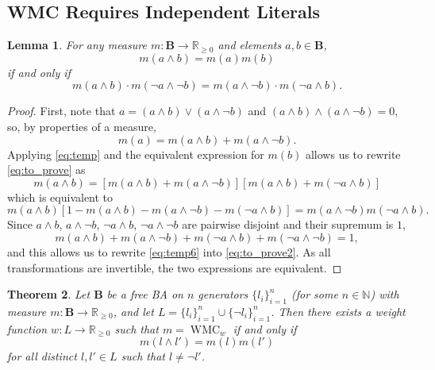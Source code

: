 \documentclass{article}
\newtheorem{theorem}{Theorem}
\newtheorem{lemma}[theorem]{Lemma}
\theoremstyle{definition}
\theoremstyle{remark}
\DeclareMathOperator{\WMC}{WMC}
\begin{document}

\subsection{WMC Requires Independent Literals}

\begin{lemma} \label{lemma:before_theorem}
  For any measure $m\colon \mathbf{B} \to \mathbb{R}_{\ge 0}$ and elements $a, b
  \in \mathbf{B}$,
  \begin{equation} \label{eq:to_prove}
    m(a \land b) = m(a)m(b)
  \end{equation}
  if and only if
  \begin{equation} \label{eq:to_prove2}
    m(a \land b) \cdot m(\neg a \land \neg b) = m(a \land \neg b)
    \cdot m(\neg a \land b).
  \end{equation}
\end{lemma}
\begin{proof}
  First, note that $a = (a \land b) \lor (a \land \neg b)$ and $(a \land b)
  \land (a \land \neg b) = 0$, so, by properties of a measure,
  \begin{equation} \label{eq:temp}
    m(a) = m(a \land b) + m(a \land \neg b).
  \end{equation}
  Applying \cref{eq:temp} and the equivalent expression for $m(b)$ allows us
  to rewrite \cref{eq:to_prove} as
  \[
    m(a \land b) = [m(a \land b) + m(a \land \neg b)][m(a \land b) + m(\neg a
    \land b)]
  \]
  which is equivalent to
  \begin{equation} \label{eq:temp6}
    m(a \land b)[1 - m(a \land b) - m(a \land \neg b) - m(\neg a \land b)] = m(a
    \land \neg b)m(\neg a \land b).
  \end{equation}
  Since $a \land b$, $a \land \neg b$, $\neg a \land b$, $\neg a \land \neg b$
  are pairwise disjoint and their supremum is $1$,
  \[
    m(a \land b) + m(a \land \neg b) + m(\neg a \land b) + m(\neg a \land \neg
    b) = 1,
  \]
  and this allows us to rewrite \cref{eq:temp6} into \cref{eq:to_prove2}. As all
  transformations are invertible, the two expressions are equivalent.
\end{proof}

\begin{theorem}
  Let $\mathbf{B}$ be a free BA on $n$ generators $\{ l_i \}_{i=1}^n$ (for some
  $n \in \mathbb{N}$) with measure $m\colon \mathbf{B} \to \mathbb{R}_{\ge 0}$,
  and let $L = \{ l_i \}_{i = 1}^n \cup \{ \neg l_i \}_{i = 1}^n$. Then there
  exists a weight function $w\colon L \to \mathbb{R}_{\ge 0}$ such that $m =
  \WMC_w$ if and only if
  \begin{equation} \label{eq:wmccondition}
  m(l \land l') = m(l)m(l')
  \end{equation}
  for all distinct $l, l' \in L$ such that $l \ne \neg l'$.
\end{theorem}
\end{document}
